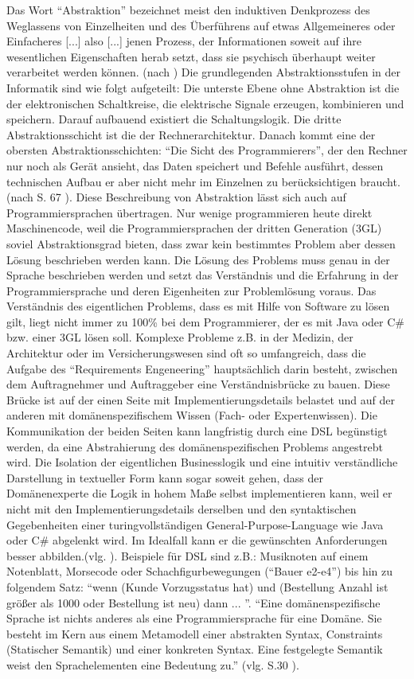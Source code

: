 \documentclass[11pt,english,ngerman, headsepline]{scrreprt}
\begin{document}
Das Wort “Abstraktion” bezeichnet meist den induktiven Denkprozess des
Weglassens von Einzelheiten und des Überführens auf etwas Allgemeineres oder
Einfacheres [...] also [...] jenen Prozess, der Informationen soweit auf ihre
wesentlichen Eigenschaften herab setzt, dass sie psychisch überhaupt weiter
verarbeitet werden können. (nach \cite{wikiAbsraktion}) Die grundlegenden
Abstraktionsstufen in der Informatik sind wie folgt aufgeteilt: Die unterste
Ebene ohne Abstraktion ist die der elektronischen Schaltkreise, die elektrische
Signale erzeugen, kombinieren und speichern. Darauf aufbauend existiert die
Schaltungslogik. Die dritte Abstraktionsschicht ist die der Rechnerarchitektur.
Danach kommt eine der obersten Abstraktionsschichten: “Die Sicht des
Programmierers”, der den Rechner nur noch als Gerät ansieht, das Daten speichert
und Befehle ausführt, dessen technischen Aufbau er aber nicht mehr im Einzelnen
zu berücksichtigen braucht. (nach S. 67 \cite{rechenberg2000informatik}). Diese
Beschreibung von Abstraktion lässt sich auch auf Programmiersprachen übertragen.
Nur wenige programmieren heute direkt Maschinencode, weil die
Programmiersprachen der dritten Generation (3GL) soviel Abstraktionsgrad bieten,
dass zwar kein bestimmtes Problem aber dessen Lösung beschrieben werden kann.
Die Lösung des Problems muss genau in der Sprache beschrieben werden und setzt
das Verständnis und die Erfahrung in der Programmiersprache und deren
Eigenheiten zur Problemlösung voraus. Das Verständnis des eigentlichen Problems,
dass es mit Hilfe von Software zu lösen gilt, liegt nicht immer zu 100\% bei dem
Programmierer, der es mit Java oder C\# bzw. einer 3GL lösen soll. Komplexe
Probleme z.B. in der Medizin, der Architektur oder im Versicherungswesen sind
oft so umfangreich, dass die Aufgabe des “Requirements Engeneering”
hauptsächlich darin besteht, zwischen dem Auftragnehmer und Auftraggeber eine
Verständnisbrücke zu bauen. Diese Brücke ist auf der einen Seite mit
Implementierungsdetails belastet und auf der anderen mit domänenspezifischem
Wissen (Fach- oder Expertenwissen). Die Kommunikation der beiden Seiten kann
langfristig durch eine DSL begünstigt werden, da eine Abstrahierung des
domänenspezifischen Problems angestrebt wird. Die Isolation der eigentlichen
Businesslogik und eine intuitiv verständliche Darstellung in textueller Form
kann sogar soweit gehen, dass der Domänenexperte die Logik in hohem Maße selbst
implementieren kann, weil er nicht mit den Implementierungsdetails derselben und
den syntaktischen Gegebenheiten einer turingvollständigen
General-Purpose-Language wie Java oder C\# abgelenkt wird. Im Idealfall kann er
die gewünschten Anforderungen besser abbilden.(vlg. \cite{heiseMPS2}). Beispiele
für DSL sind z.B.: Musiknoten auf einem Notenblatt, Morsecode oder
Schachfigurbewegungen (“Bauer e2-e4”) bis hin zu folgendem Satz: “wenn (Kunde
Vorzugsstatus hat) und (Bestellung Anzahl ist größer als 1000 oder Bestellung
ist neu) dann ... ”. “Eine domänenspezifische Sprache ist nichts anderes als
eine Programmiersprache für eine Domäne. Sie besteht im Kern aus einem
Metamodell einer abstrakten Syntax, Constraints (Statischer Semantik) und einer
konkreten Syntax. Eine festgelegte Semantik weist den Sprachelementen eine
Bedeutung zu.” (vlg. S.30 \cite{mdaDPunkt}). 
\end{document}
